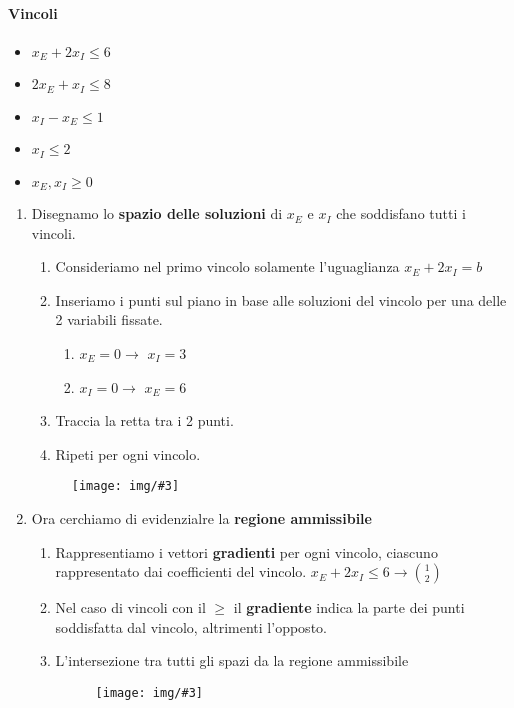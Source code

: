 \documentclass[12pt, twoside, letterpaper]{article}
\newcommand{\img}[3] {
	\begin{figure}[h]
		\caption{#1}
		\centering
		\texttt{[image: img/\#3]}\\
	\end{figure}
}
\begin{document}
			\paragraph{Vincoli}
				\begin{itemize}
					\item $x_E + 2x_I \leq 6$
					\item $2x_E + x_I \leq 8$
					\item $x_I - x_E \leq 1$
					\item $x_I \leq 2$
					\item $x_E, x_I \geq 0 $
				\end{itemize} 
			\begin{enumerate}
				\item Disegnamo lo \textbf{spazio delle soluzioni} di $x_E$ e $x_I$ che soddisfano tutti i vincoli.
				\begin{enumerate}
					\item Consideriamo nel primo vincolo solamente l'uguaglianza $x_E + 2x_I = b$
					\item Inseriamo i punti sul piano in base alle soluzioni del vincolo per una delle 2 variabili fissate. 
					\begin{enumerate}
						\item $x_E = 0 \rightarrow$ $x_I = 3$	
						\item $x_I = 0 \rightarrow$ $x_E = 6$			
					\end{enumerate}	
					\item Traccia la retta tra i 2 punti.
					\item Ripeti per ogni vincolo.
				\end{enumerate}
				\img{}{0.2}{img1.jpg}
				
				\item Ora cerchiamo di evidenzialre la \textbf{regione ammissibile}
					\begin{enumerate}
						\item Rappresentiamo i vettori \textbf{gradienti} per ogni vincolo, ciascuno rappresentato dai coefficienti del vincolo. $x_E + 2x_I \leq 6 \rightarrow \binom{1}{2}$
						\item Nel caso di vincoli con il $\geq$ il \textbf{gradiente} indica la parte dei punti soddisfatta dal vincolo, altrimenti l'opposto.
						\item L'intersezione tra tutti gli spazi da la regione ammissibile
						\img{}{0.2}{img2.jpg}
					\end{enumerate}
					

\end{enumerate}
\end{document}
